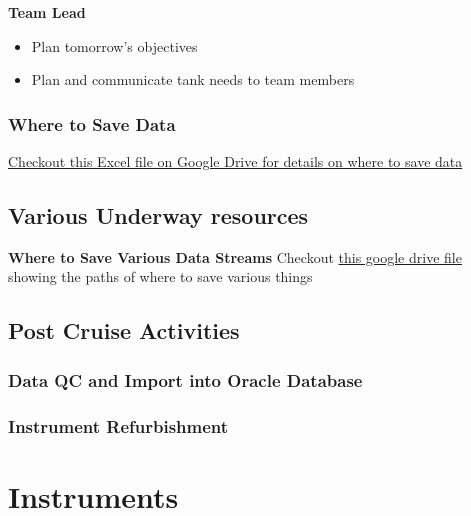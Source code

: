 \documentclass[
]{book}
\providecommand{\tightlist}{%
  \setlength{\itemsep}{0pt}\setlength{\parskip}{0pt}}
\begin{document}
\textbf{Team Lead}

\begin{itemize}
\tightlist
\item
  Plan tomorrow's objectives
\item
  Plan and communicate tank needs to team members
\end{itemize}

\hypertarget{where-to-save-data}{%
\section{Where to Save Data}\label{where-to-save-data}}

\href{https://drive.google.com/open?id=16l1OQgGEunLoADh_MEGyIfbQL2w0u6aw}{Checkout this Excel file on Google Drive for details on where to save data}

\hypertarget{various-underway-resources}{%
\chapter{Various Underway resources}\label{various-underway-resources}}

\textbf{Where to Save Various Data Streams}
Checkout \href{https://docs.google.com/spreadsheets/d/16l1OQgGEunLoADh_MEGyIfbQL2w0u6aw/edit\#gid=1675337307}{this google drive file} showing the paths of where to save various things

\hypertarget{postcruise}{%
\chapter{Post Cruise Activities}\label{postcruise}}

\hypertarget{data-qc-and-import-into-oracle-database}{%
\section{Data QC and Import into Oracle Database}\label{data-qc-and-import-into-oracle-database}}

\hypertarget{instrument-refurbishment}{%
\section{Instrument Refurbishment}\label{instrument-refurbishment}}

\hypertarget{part-instruments}{%
\part*{Instruments}\label{part-instruments}}
\end{document}
